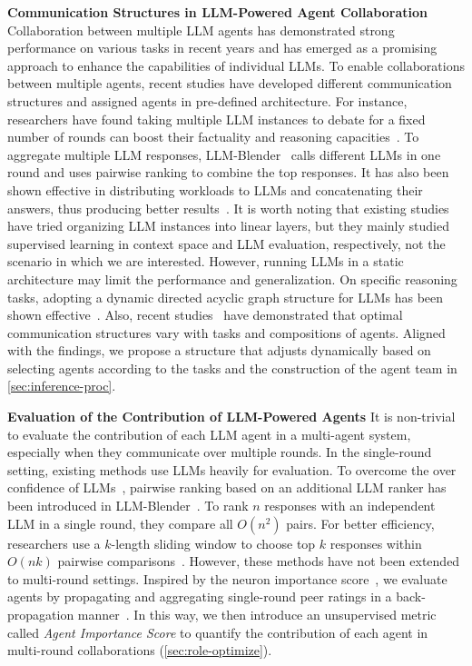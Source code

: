 \documentclass{article} %
\begin{document}
\noindent
\textbf{Communication Structures in LLM-Powered Agent Collaboration}
Collaboration between multiple LLM agents has demonstrated strong performance on various tasks in recent years and has emerged as a promising approach to enhance the capabilities of individual LLMs. To enable collaborations between multiple agents, recent studies have developed different communication structures and assigned agents in pre-defined architecture. 
For instance, researchers have found taking multiple LLM instances to debate for a fixed number of rounds can boost their factuality and reasoning capacities~\citep{debate1-mit, debate2-thu, debate3-multi-models}.  
To aggregate multiple LLM responses, LLM-Blender~\citep{blender} calls different LLMs in one round and uses pairwise ranking to combine the top responses. It has also been shown effective in distributing workloads to LLMs and concatenating their answers, thus producing better results~\citep{sot,meta-prompting,autoact}. 
It is worth noting that existing studies~\citep{chatllm-network, widedeep} have tried organizing LLM instances into linear layers, but they mainly studied supervised learning in context space and LLM evaluation, respectively, not the scenario in which we are interested. 
However, running LLMs in a static architecture may limit the performance and generalization. 
On specific reasoning tasks, adopting a dynamic directed acyclic graph structure for LLMs has been shown effective~\citep{cumulative-cr}.%
Also, recent studies~\citep{exchange-of-thought,chen2023agentverse,social-collab,gpt-swarm} have demonstrated that optimal communication structures vary with tasks and compositions of agents. 
Aligned with the findings, we propose a structure that adjusts dynamically based on selecting agents according to the tasks and the construction of the agent team in \cref{sec:inference-proc}. 

\noindent
\textbf{Evaluation of the Contribution of LLM-Powered Agents}
It is non-trivial to evaluate the contribution of each LLM agent in a multi-agent system, especially when they communicate over multiple rounds. In the single-round setting, existing methods use LLMs heavily for evaluation. To overcome the over confidence of LLMs~\citep{llm-overconfident}, pairwise ranking based on an additional LLM ranker has been introduced in LLM-Blender~\citep{blender}. To rank $n$ responses with an independent LLM in a single round, they compare all $O(n^2)$ pairs. For better efficiency, researchers use a $k$-length sliding window to choose top $k$ responses within $O(nk)$ pairwise comparisons~\citep{sliding-window}. However, these methods have not been extended to multi-round settings.
Inspired by the neuron importance score~\citep{imp-score}, we evaluate agents by propagating and aggregating single-round peer ratings in a back-propagation manner~\citep{rumelhart1986learning}. In this way, we then introduce an unsupervised metric called \textit{Agent Importance Score} to quantify the contribution of each agent in multi-round collaborations (\cref{sec:role-optimize}).
\end{document}
